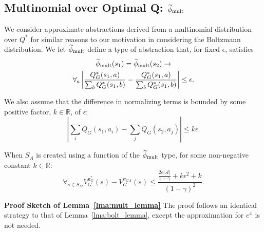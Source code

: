 \subsection{Multinomial over Optimal Q: $\epMu$}
\label{sec:mult}

We consider approximate abstractions derived from a multinomial distribution over $Q^*$ for similar reasons to our motivation in considering the Boltzmann distribution. 
\bdefn{$\epMu$}
We let $\epMu$ define a type of abstraction that, for fixed $\epsilon$, satisfies
\begin{multline}
\widetilde \phi_{\text{mult}}(s_1) = \widetilde \phi_{\text{mult}}(s_2) \rightarrow \\
\forall_{a} \left|\frac{Q_G^*(s_1,a)}{\sum_b Q_G^*(s_1,b)} - \frac{Q_G^*(s_1,a)}{\sum_b Q_G^*(s_1,b)}\right| \leq \epsilon.
\end{multline}
\edefn
{}

We also assume that the difference in normalizing terms is bounded by some positive factor, $k \in \mathbb{R}$, of $\epsilon$:
\begin{equation}
\left |\sum_i Q_G(s_1,a_i) - \sum_j Q_G(s_2,a_j) \right | \leq k\epsilon.
\end{equation}
\begin{lma} When $S_A$ is created using a function of the $\epMu$ type, for some non-negative constant $k \in \mathbb{R}$:
\begin{equation}
\forall_{s \in S_M} V_G^{\pi^*_G}(s) - V_G^{\pi_{GA}}(s) \leq \frac{\frac{2\epsilon|\mathcal{A}|}{1-\gamma} + k \epsilon^2 + k}{(1-\gamma)^2}.
\end{equation}
\label{lma:mult_lemma}
\end{lma}

{\bf Proof Sketch of Lemma~\ref{lma:mult_lemma}} The proof follows an identical strategy to that of Lemma~\ref{lma:bolt_lemma}, except the approximation for $e^x$ is not needed.


